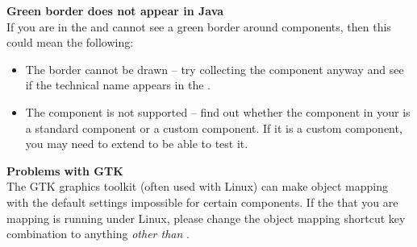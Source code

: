% 
%
%


\textbf{Green border does not appear in Java \gdauts{}}\\
If you are in the \gdomm{}  and cannot see a green border around components, then this could mean the following:
\begin{itemize}
\item The border cannot be drawn -- try collecting the component anyway and see if the technical name appears in the \gdomeditor{}. 
\item The component is not supported -- find out whether the component in your \gdaut{} is a standard component or a custom component. If it is a custom component, you may need to extend \app{} to be able to test it. 
\end{itemize}


\textbf{Problems with GTK}\\
The GTK graphics toolkit (often used with Linux) can make object mapping with the default \app{} settings impossible for certain components. If the \gdaut{} that you are mapping is running under Linux, please change the object mapping shortcut key combination to anything \emph{other than} .
